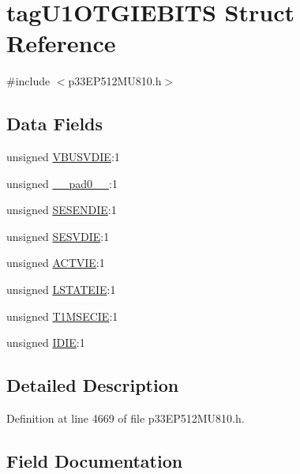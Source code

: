 \hypertarget{structtag_u1_o_t_g_i_e_b_i_t_s}{}\section{tag\+U1\+O\+T\+G\+I\+E\+B\+I\+TS Struct Reference}
\label{structtag_u1_o_t_g_i_e_b_i_t_s}


{\ttfamily \#include $<$p33\+E\+P512\+M\+U810.\+h$>$}

\subsection*{Data Fields}
\begin{DoxyCompactItemize}
\item 
unsigned \hyperlink{structtag_u1_o_t_g_i_e_b_i_t_s_a6f1ab6ca457c84d887e60a0976da6ce3}{V\+B\+U\+S\+V\+D\+IE}\+:1
\item 
unsigned \hyperlink{structtag_u1_o_t_g_i_e_b_i_t_s_adf71f3d8410c1f1dbbc96680a92c49af}{\+\_\+\+\_\+pad0\+\_\+\+\_\+}\+:1
\item 
unsigned \hyperlink{structtag_u1_o_t_g_i_e_b_i_t_s_a52fe73bcb859a454860d7f8b75116646}{S\+E\+S\+E\+N\+D\+IE}\+:1
\item 
unsigned \hyperlink{structtag_u1_o_t_g_i_e_b_i_t_s_a5409059c6c0b50c1ced8d4efa859a8c2}{S\+E\+S\+V\+D\+IE}\+:1
\item 
unsigned \hyperlink{structtag_u1_o_t_g_i_e_b_i_t_s_a86bddfee6a35441e26db360b6b160e8a}{A\+C\+T\+V\+IE}\+:1
\item 
unsigned \hyperlink{structtag_u1_o_t_g_i_e_b_i_t_s_ae5723df6e72ec846d5a37a1cf189ad88}{L\+S\+T\+A\+T\+E\+IE}\+:1
\item 
unsigned \hyperlink{structtag_u1_o_t_g_i_e_b_i_t_s_a6ef23ade24af224af9252c36ef2bd31e}{T1\+M\+S\+E\+C\+IE}\+:1
\item 
unsigned \hyperlink{structtag_u1_o_t_g_i_e_b_i_t_s_a9535365be23edc6b9c108a2306a615d9}{I\+D\+IE}\+:1
\end{DoxyCompactItemize}


\subsection{Detailed Description}


Definition at line 4669 of file p33\+E\+P512\+M\+U810.\+h.



\subsection{Field Documentation}
\mbox{\label{structtag_u1_o_t_g_i_e_b_i_t_s_adf71f3d8410c1f1dbbc96680a92c49af}} 
